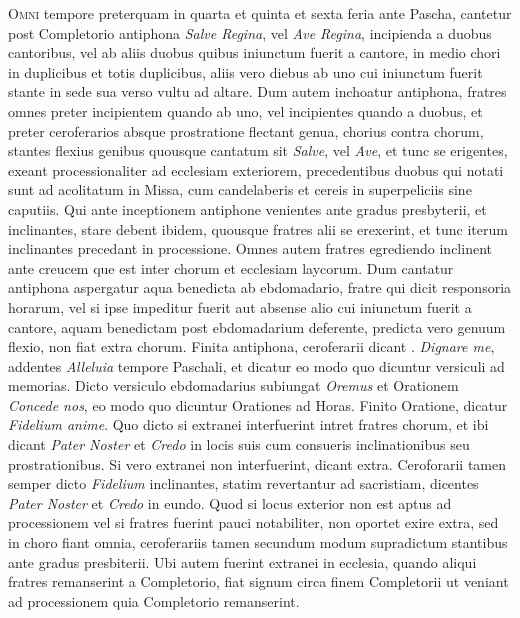 \begin{multicols*}{2}
{\color{Red} }
\lettrine[lines=2]{\zallmancaps \color{Red} O}{mni} tempore preterquam in quarta et quinta et sexta feria ante Pascha, cantetur post Completorio antiphona \textit{Salve Regina}, vel \textit{Ave Regina}, incipienda a duobus cantoribus, vel ab aliis duobus quibus iniunctum fuerit a cantore, in medio chori in duplicibus et totis duplicibus, aliis vero diebus ab uno cui iniunctum fuerit stante in sede sua verso vultu ad altare.
Dum autem inchoatur antiphona, fratres omnes preter incipientem quando ab uno, vel incipientes quando a duobus, et preter ceroferarios absque prostratione flectant genua, chorius contra chorum, stantes flexius genibus quousque cantatum sit \textit{Salve}, vel \textit{Ave}, et tunc se erigentes, exeant processionaliter ad ecclesiam exteriorem, precedentibus duobus qui notati sunt ad acolitatum in Missa, cum candelaberis et cereis in superpeliciis sine caputiis. Qui ante inceptionem antiphone venientes ante gradus presbyterii, et inclinantes, stare debent ibidem, quousque fratres alii se erexerint, et tunc iterum inclinantes precedant in processione. Omnes autem fratres egrediendo inclinent ante creucem que est inter chorum et ecclesiam laycorum.
Dum cantatur antiphona aspergatur aqua benedicta ab ebdomadario, fratre qui dicit responsoria horarum, vel si ipse impeditur fuerit aut absense alio cui iniunctum fuerit a cantore, aquam benedictam post ebdomadarium deferente, predicta vero genuum flexio, non fiat extra chorum. Finita antiphona, ceroferarii dicant \Vbar . \textit{Dignare me}, addentes \textit{Alleluia} tempore Paschali, et dicatur eo modo quo dicuntur versiculi ad memorias. Dicto versiculo ebdomadarius subiungat \textit{Oremus} et Orationem \textit{Concede nos}, eo modo quo dicuntur Orationes ad Horas. Finito Oratione, dicatur \textit{Fidelium anime}. Quo dicto si extranei interfuerint intret fratres chorum, et ibi dicant \textit{Pater Noster} et \textit{Credo} in locis suis cum consueris inclinationibus seu prostrationibus.
Si vero extranei non interfuerint, dicant extra. Ceroforarii tamen semper dicto \textit{Fidelium} inclinantes, statim revertantur ad sacristiam, dicentes \textit{Pater Noster} et \textit{Credo} in eundo. Quod si locus exterior non est aptus ad processionem vel si fratres fuerint pauci notabiliter, non oportet exire extra, sed in choro fiant omnia, ceroferariis tamen secundum modum supradictum stantibus ante gradus presbiterii.
Ubi autem fuerint extranei in ecclesia, quando aliqui fratres remanserint a Completorio, fiat signum circa finem Completorii ut veniant ad processionem quia Completorio remanserint.


\end{multicols*}

